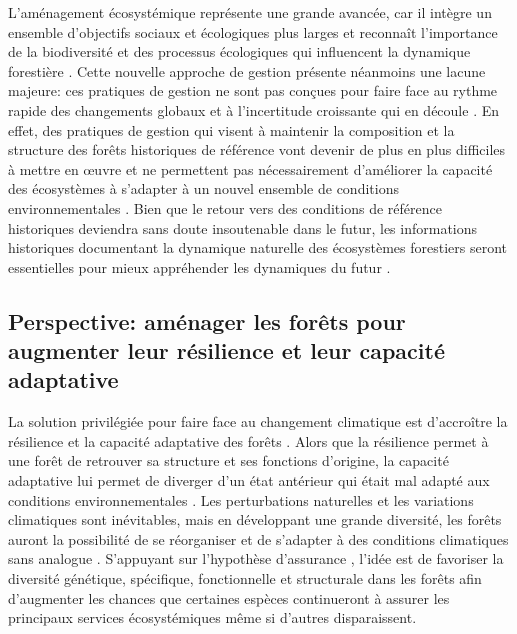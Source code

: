 L'aménagement écosystémique représente une grande avancée, car il
intègre un ensemble d'objectifs sociaux et écologiques plus larges et
reconnaît l'importance de la biodiversité et des processus écologiques
qui influencent la dynamique forestière
\citep{kuuluvainen_forest_2009, messier_functional_2019}. Cette nouvelle
approche de gestion présente néanmoins une lacune majeure: ces pratiques
de gestion ne sont pas conçues pour faire face au rythme rapide des
changements globaux et à l'incertitude croissante qui en découle
\citep{messier_dealing_2016, millar_climate_2007}. En effet, des
pratiques de gestion qui visent à maintenir la composition et la
structure des forêts historiques de référence vont devenir de plus en
plus difficiles à mettre en \oe{}uvre
\citep{boulanger_climate_2019, duveneck_measuring_2016} et ne permettent
pas nécessairement d'améliorer la capacité des écosystèmes à s'adapter à
un nouvel ensemble de conditions environnementales
\citep{seastedt_management_2008}. Bien que le retour vers des conditions
de référence historiques deviendra sans doute insoutenable dans le
futur, les informations historiques documentant la dynamique naturelle
des écosystèmes forestiers seront essentielles pour mieux appréhender
les dynamiques du futur \citep{harris_ecological_2006}.

\hypertarget{perspective-amuxe9nager-les-foruxeats-pour-augmenter-leur-ruxe9silience-et-leur-capacituxe9-adaptative}{%
\subsection{Perspective: aménager les forêts pour augmenter leur
résilience et leur capacité
adaptative}\label{perspective-amuxe9nager-les-foruxeats-pour-augmenter-leur-ruxe9silience-et-leur-capacituxe9-adaptative}}

La solution privilégiée pour faire face au changement climatique est
d'accroître la résilience et la capacité adaptative des forêts
\citep{messier_managing_2013, seastedt_management_2008}. Alors que la
résilience permet à une forêt de retrouver sa structure et ses fonctions
d'origine, la capacité adaptative lui permet de diverger d'un état
antérieur qui était mal adapté aux conditions environnementales
\citep{filotas_viewing_2014}. Les perturbations naturelles et les
variations climatiques sont inévitables, mais en développant une grande
diversité, les forêts auront la possibilité de se réorganiser et de
s'adapter à des conditions climatiques sans analogue
\citep{messier_dealing_2016}. S'appuyant sur l'hypothèse d'assurance
\citep[de l'anglais \emph{insurance
hypothesis};][]{yachi_biodiversity_1999}, l'idée est de favoriser la
diversité génétique, spécifique, fonctionnelle et structurale dans les
forêts afin d'augmenter les chances que certaines espèces continueront à
assurer les principaux services écosystémiques même si d'autres
disparaissent.

